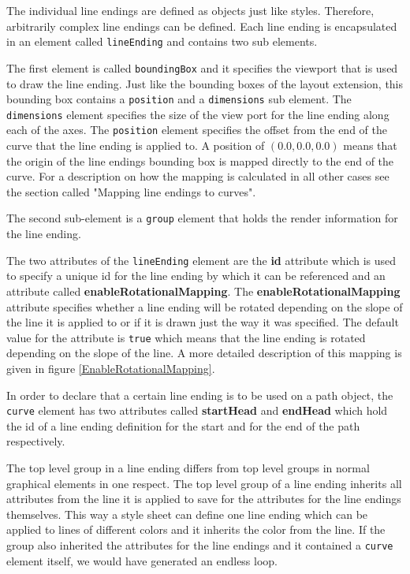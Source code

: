The individual line endings are defined as \Group objects just like styles. 
Therefore, 
arbitrarily complex line endings can be defined. Each line ending is
encapsulated in an element called \texttt{lineEnding} and contains two
sub elements. 

The first element is called \texttt{boundingBox} and it specifies the
viewport that is used to draw the line ending. Just like the bounding boxes of
the layout extension, this bounding box contains a \texttt{position} and a
\texttt{dimensions} sub element. The \texttt{dimensions} element  
specifies the size of the view port for the line ending along each of the axes. 
The \texttt{position} element specifies the offset from the end of the curve that the line ending is applied to.
A position of $(0.0, 0.0, 0.0)$ means that the origin of the line endings bounding box is mapped directly to
the end of the curve. For a description on how the mapping is calculated in all other cases see the section called "Mapping line endings to curves".


The second sub-element is a \texttt{group} element that holds the render
information for the line ending. 

The two attributes of the \texttt{lineEnding}
element are the \textbf{id} attribute which is used to specify a unique id for
the line ending by which it can be referenced and an attribute called \textbf{enable\-Rotational\-Mapping}.
The \textbf{enable\-Rotational\-Mapping} attribute specifies whether a line ending
will be rotated depending on the slope of the line it is applied to or if it is
drawn just the way it was specified. The default value for the attribute is
\texttt{true} which means that the line ending is rotated depending on the
slope of the line. A more detailed description of this mapping is given in figure \ref{EnableRotationalMapping}.

In order to declare that a certain line ending is to be used on a path object,
the \texttt{curve} element has two attributes called \textbf{startHead} and
\textbf{endHead} which hold the id of a line ending definition for the start and 
for the end of the path respectively.

The top level group in a line ending differs from top level groups in normal graphical elements in one respect. The top level group of a line ending inherits all attributes from the line it is applied to save for the attributes for the line endings themselves. This way a style sheet can define one line ending which can be applied to lines of different colors and it inherits the color from the line.
If the group also inherited the attributes for the line endings and it contained a \texttt{curve} element itself, we would have generated an endless loop.

